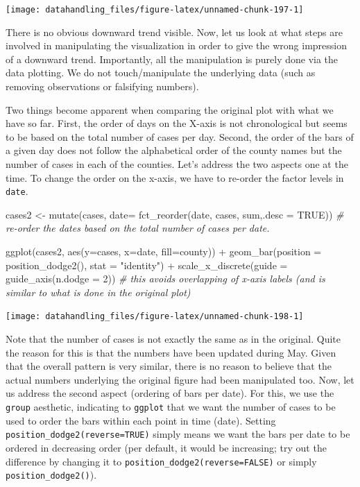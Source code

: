 \documentclass[
  12pt,
]{style/krantz}
\newenvironment{Shaded}{\begin{snugshade}}{\end{snugshade}}
\newcommand{\AttributeTok}[1]{\textcolor[rgb]{0.77,0.63,0.00}{#1}}
\newcommand{\CommentTok}[1]{\textcolor[rgb]{0.56,0.35,0.01}{\textit{#1}}}
\newcommand{\ConstantTok}[1]{\textcolor[rgb]{0.00,0.00,0.00}{#1}}
\newcommand{\DecValTok}[1]{\textcolor[rgb]{0.00,0.00,0.81}{#1}}
\newcommand{\FunctionTok}[1]{\textcolor[rgb]{0.00,0.00,0.00}{#1}}
\newcommand{\NormalTok}[1]{#1}
\newcommand{\OtherTok}[1]{\textcolor[rgb]{0.56,0.35,0.01}{#1}}
\newcommand{\SpecialCharTok}[1]{\textcolor[rgb]{0.00,0.00,0.00}{#1}}
\newcommand{\StringTok}[1]{\textcolor[rgb]{0.31,0.60,0.02}{#1}}
\begin{document}
\texttt{[image: datahandling\_files/figure-latex/unnamed-chunk-197-1]}

There is no obvious downward trend visible. Now, let us look at what steps are involved in manipulating the visualization in order to give the wrong impression of a downward trend. Importantly, all the manipulation is purely done via the data plotting. We do not touch/manipulate the underlying data (such as removing observations or falsifying numbers).

Two things become apparent when comparing the original plot with what we have so far. First, the order of days on the X-axis is not chronological but seems to be based on the total number of cases per day. Second, the order of the bars of a given day does not follow the alphabetical order of the county names but the number of cases in each of the counties. Let's address the two aspects one at the time. To change the order on the x-axis, we have to re-order the factor levels in \texttt{date}.

\begin{Shaded}
\begin{Highlighting}[]
\NormalTok{cases2 }\OtherTok{\textless{}{-}} \FunctionTok{mutate}\NormalTok{(cases, }\AttributeTok{date=} \FunctionTok{fct\_reorder}\NormalTok{(date, cases, sum,}\AttributeTok{.desc =} \ConstantTok{TRUE}\NormalTok{)) }\CommentTok{\# re{-}order the dates based on the total number of cases per date.}

\FunctionTok{ggplot}\NormalTok{(cases2, }\FunctionTok{aes}\NormalTok{(}\AttributeTok{y=}\NormalTok{cases, }\AttributeTok{x=}\NormalTok{date, }\AttributeTok{fill=}\NormalTok{county)) }\SpecialCharTok{+}
  \FunctionTok{geom\_bar}\NormalTok{(}\AttributeTok{position =} \FunctionTok{position\_dodge2}\NormalTok{(), }\AttributeTok{stat =} \StringTok{"identity"}\NormalTok{) }\SpecialCharTok{+}
  \FunctionTok{scale\_x\_discrete}\NormalTok{(}\AttributeTok{guide =} \FunctionTok{guide\_axis}\NormalTok{(}\AttributeTok{n.dodge =} \DecValTok{2}\NormalTok{))  }\CommentTok{\# this avoids overlapping of x{-}axis labels (and is similar to what is done in the original plot)}
\end{Highlighting}
\end{Shaded}

\texttt{[image: datahandling\_files/figure-latex/unnamed-chunk-198-1]}

Note that the number of cases is not exactly the same as in the original. Quite the reason for this is that the numbers have been updated during May. Given that the overall pattern is very similar, there is no reason to believe that the actual numbers underlying the original figure had been manipulated too. Now, let us address the second aspect (ordering of bars per date). For this, we use the \texttt{group} aesthetic, indicating to \texttt{ggplot} that we want the number of cases to be used to order the bars within each point in time (date). Setting \texttt{position\_dodge2(reverse=TRUE)} simply means we want the bars per date to be ordered in decreasing order (per default, it would be increasing; try out the difference by changing it to \texttt{position\_dodge2(reverse=FALSE)} or simply \texttt{position\_dodge2()}).
\end{document}
